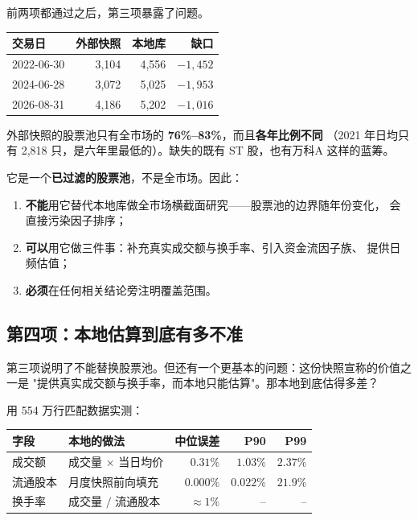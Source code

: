 前两项都通过之后，第三项暴露了问题。

\begin{center}
\begin{tabular}{@{}lrrr@{}}
\toprule
交易日 & 外部快照 & 本地库 & 缺口 \\
\midrule
2022-06-30 & 3,104 & 4,556 & $-1,452$ \\
2024-06-28 & 3,072 & 5,025 & $-1,953$ \\
2026-08-31 & 4,186 & 5,202 & $-1,016$ \\
\bottomrule
\end{tabular}
\end{center}

外部快照的股票池只有全市场的 \textbf{76\%--83\%}，而且\textbf{各年比例不同}
（2021 年日均只有 2,818 只，是六年里最低的）。缺失的既有 ST 股，也有万科A
这样的蓝筹。

\begin{keybox}[这份快照的正确用法]
它是一个\textbf{已过滤的股票池}，不是全市场。因此：
\begin{enumerate}
  \item \textbf{不能}用它替代本地库做全市场横截面研究——股票池的边界随年份变化，
        会直接污染因子排序；
  \item \textbf{可以}用它做三件事：补充真实成交额与换手率、引入资金流因子族、
        提供日频估值；
  \item \textbf{必须}在任何相关结论旁注明覆盖范围。
\end{enumerate}
\end{keybox}

\subsection{第四项：本地估算到底有多不准}

第三项说明了不能替换股票池。但还有一个更基本的问题：这份快照宣称的价值之一是
"提供真实成交额与换手率，而本地只能估算"。那本地到底估得多差？

用 554 万行匹配数据实测：

\begin{center}
\begin{tabular}{@{}llrrr@{}}
\toprule
字段 & 本地的做法 & 中位误差 & P90 & P99 \\
\midrule
成交额 & 成交量 $\times$ 当日均价 & $0.31\%$ & $1.03\%$ & $2.37\%$ \\
流通股本 & 月度快照前向填充 & $0.000\%$ & $0.022\%$ & $21.9\%$ \\
换手率 & 成交量 $/$ 流通股本 & $\approx 1\%$ & -- & -- \\
\bottomrule
\end{tabular}
\end{center}


